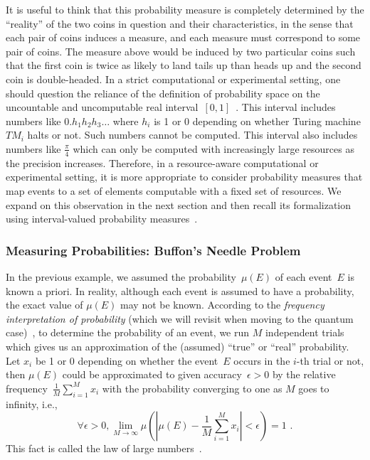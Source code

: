 \documentclass{article}
\theoremstyle{remark}
\newcommand{\pmeas}{\ensuremath{\mu}}
\begin{document}
\noindent It is useful to think that this probability measure is completely
determined by the ``reality'' of the two coins in question and their
characteristics, in the sense that each pair of coins induces a measure,
and each measure must correspond to some pair of coins. The measure
above would be induced by two particular coins such that the first
coin is twice as likely to land tails up than heads up and the second
coin is double-headed. In a strict computational or experimental setting,
one should question the reliance of the definition of probability
space on the uncountable and uncomputable real interval~$[0,1]$~\cite{Turing_1937,Ziegler2007,weihrauch2012computable}.
This interval includes numbers like $0.h_{1}h_{2}h_{3}\ldots$ where
$h_{i}$ is 1 or 0 depending on whether Turing machine $\mathit{TM}_{i}$
halts or not. Such numbers cannot be computed. This interval also
includes numbers like $\frac{\pi}{4}$ which can only be computed
with increasingly large resources as the precision increases. Therefore,
in a resource-aware computational or experimental setting, it is more
appropriate to consider probability measures that map events to a
set of elements computable with a fixed set of resources. We expand
on this observation in the next section and then recall its formalization
using interval-valued probability measures~\cite{Weichselberger2000,JamisonLodwick2004}.



\subsubsection{Measuring Probabilities: Buffon's Needle Problem\label{subsec:Measuring-Probabilities:-Buffon}}

In the previous example, we assumed the probability~$\pmeas(E)$
of each event~$E$ is known a priori. In reality, although each event
is assumed to have a probability, the exact value of $\pmeas(E)$
may not be known. According to the \emph{frequency interpretation
of probability} (which we will revisit when moving to the quantum
case)~\cite{Venn1876,Hajek2012}, to determine the probability of
an event, we run $M$ independent trials which gives us an approximation
of the (assumed) ``true'' or ``real'' probability. Let $x_{i}$
be 1 or 0 depending on whether the event~$E$ occurs in the $i$-th
trial or not, then $\pmeas(E)$ could be approximated to given accuracy~$\epsilon>0$
by the relative frequency~$\frac{1}{M}\sum_{i=1}^{M}x_{i}$ with
the probability converging to one as $M$ goes to infinity, i.e.,
\[
\forall\epsilon>0,\lim_{M\rightarrow\infty}\pmeas\left(\left|\pmeas(E)-\frac{1}{M}\sum_{i=1}^{M}x_{i}\right|<\epsilon\right)=1\textrm{ .}
\]
This fact is called the law of large numbers~\cite{Bernoulli2006,Kolmogorov1950,Uspensky1937,Shafer1976,544199}.
\end{document}
